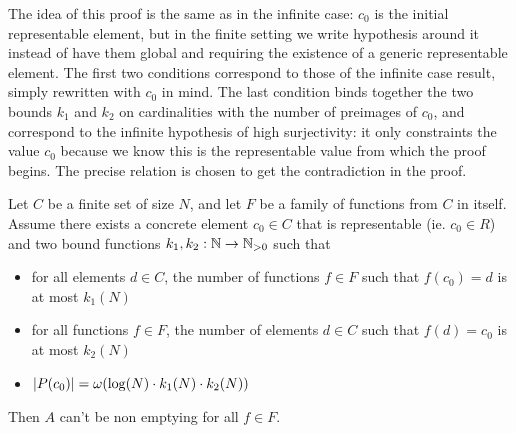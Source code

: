 The idea of this proof is the same as in the infinite case: $c_0$ is the initial representable element, but in the finite setting we write hypothesis around it instead of have them global and requiring the existence of a generic representable element. The first two conditions correspond to those of the infinite case result, simply rewritten with $c_0$ in mind. The last condition binds together the two bounds $k_1$ and $k_2$ on cardinalities with the number of preimages of $c_0$, and correspond to the infinite hypothesis of high surjectivity: it only constraints the value $c_0$ because we know this is the representable value from which the proof begins. The precise relation is chosen to get the contradiction in the proof.
\begin{theorem}\label{ch4:th:non-empt-res-finite-global}
	Let $C$ be a finite set of size $N$, and let $F$ be a family of functions from $C$ in itself. Assume there exists a concrete element $c_0 \in C$ that is representable (ie. $c_0 \in R$) and two bound functions $k_1, k_2 : \mathbb{N} \rightarrow \mathbb{N}_{>0}$ such that
	\begin{itemize}
		\item for all elements $d \in C$, the number of functions $f \in F$ such that $f(c_0) = d$ is at most $k_1(N)$
		\item for all functions $f \in F$, the number of elements $d \in C$ such that $f(d) = c_0$ is at most $k_2(N)$
		\item $\lvert P(c_0)\rvert = \omega(\log(N) \cdot k_1(N) \cdot k_2(N))$
	\end{itemize}
	Then $A$ can't be non emptying for all $f \in F$.
\end{theorem}
